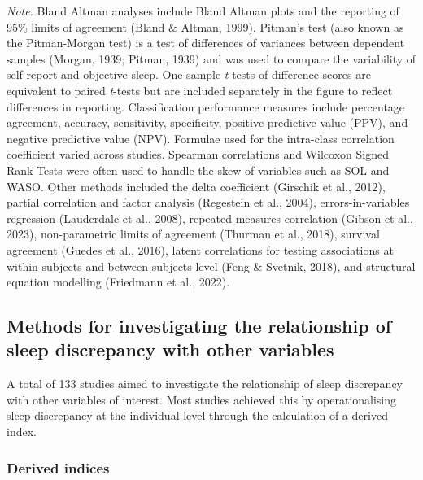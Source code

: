 \documentclass[
]{article}
\begin{document}
\emph{Note.} Bland Altman analyses include Bland Altman plots and the reporting of 95\% limits of agreement (Bland \& Altman, 1999). Pitman's test (also known as the Pitman-Morgan test) is a test of differences of variances between dependent samples (Morgan, 1939; Pitman, 1939) and was used to compare the variability of self-report and objective sleep.
One-sample \emph{t}-tests of difference scores are equivalent to paired \emph{t}-tests but are included separately in the figure to reflect differences in reporting. Classification performance measures include percentage agreement, accuracy, sensitivity, specificity, positive predictive value (PPV), and negative predictive value (NPV). Formulae used for the intra-class correlation coefficient varied across studies. Spearman correlations and Wilcoxon Signed Rank Tests were often used to handle the skew of variables such as SOL and WASO. Other methods included the delta coefficient (Girschik et al., 2012), partial correlation and factor analysis (Regestein et al., 2004), errors-in-variables regression (Lauderdale et al., 2008), repeated measures correlation (Gibson et al., 2023), non-parametric limits of agreement (Thurman et al., 2018), survival agreement (Guedes et al., 2016), latent correlations for testing associations at within-subjects and between-subjects level (Feng \& Svetnik, 2018), and structural equation modelling (Friedmann et al., 2022).

\subsection{Methods for investigating the relationship of sleep discrepancy with other variables}\label{methods-for-investigating-the-relationship-of-sleep-discrepancy-with-other-variables}

A total of 133 studies aimed to investigate the relationship of sleep discrepancy with other variables of interest. Most studies achieved this by operationalising sleep discrepancy at the individual level through the calculation of a derived index.

\subsubsection{Derived indices}\label{derived-indices}
\end{document}
